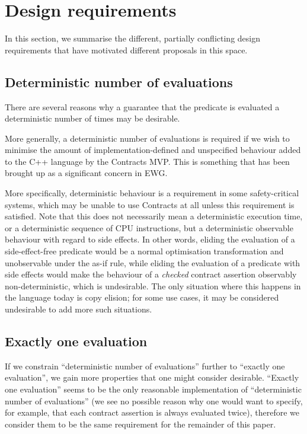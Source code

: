 
\section{Design requirements}
\label{sec:reqs}

In this section, we summarise the different, partially conflicting design requirements that have motivated different proposals in this space.

\subsection{Deterministic number of evaluations}
\label{subsec:determ}
There are several reasons why a guarantee that the predicate is evaluated a deterministic number of times may be desirable.

More generally, a deterministic number of evaluations is required if we wish to minimise the amount of implementation-defined and unspecified behaviour added to the C++ language by the Contracts MVP. This is something that has been brought up as a significant concern in EWG.

More specifically, deterministic behaviour is a requirement in some safety-critical systems, which may be unable to use Contracts at all unless this requirement is satisfied. Note that this does not necessarily mean a deterministic execution time, or a deterministic sequence of CPU instructions, but a deterministic observable behaviour with regard to side effects. In other words, eliding the evaluation of a side-effect-free predicate would be a normal optimisation transformation and unobservable under the as-if rule, while eliding the evaluation of a predicate with side effects would make the behaviour of a \emph{checked} contract assertion observably non-deterministic, which is undesirable. The only situation where this happens in the language today is copy elision; for some use cases, it may be considered undesirable to add more such situations.

\subsection{Exactly one evaluation}
If we constrain ``deterministic number of evaluations'' further to ``exactly one evaluation'', we gain more properties that one might consider desirable. ``Exactly one evaluation'' seems to be the only reasonable implementation of ``deterministic number of evaluations'' (we see no possible reason why one would want to specify, for example, that each contract assertion is always evaluated twice), therefore we consider them to be the same requirement for the remainder of this paper.

